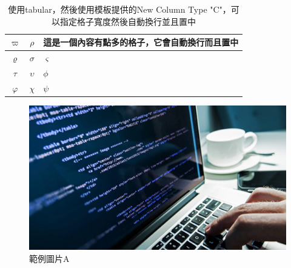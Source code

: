 \begin{table}[ht]
    \centering
    \renewcommand{\arraystretch}{1.2}

    \begin{tabular}{ c | c | C{10em}}
        $\varpi $   & $\rho  $      & 這是一個內容有點多的格子，它會自動換行而且置中 \\ \hline\hline
        $\varrho  $ & $\sigma  $    & $\varsigma  $                                  \\\hline
        $\tau  $    & $\upsilon   $ & $\phi   $                                      \\\hline
        $\varphi $  & $\chi   $     & $\psi   $                                      \\\hline
    \end{tabular}

    \renewcommand{\arraystretch}{1}

    \caption{使用tabular，然後使用模板提供的New Column Type "C"，可以指定格子寬度然後自動換行並且置中}
    \label{tab:tabexample3}
\end{table}

\begin{figure}[hpbt]
    \centering
    \includegraphics[width=\textwidth]{Figures/computer_science.jpg}
    \caption{範例圖片A}
    \label{fig:figexample}
\end{figure}

